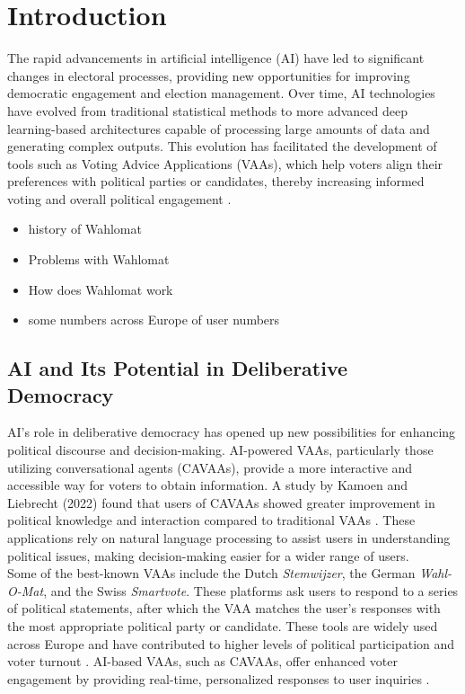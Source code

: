 \documentclass{article}
\begin{document}
\newpage
\tableofcontents
\newpage  


\section{Introduction}


The rapid advancements in artificial intelligence (AI) have led to significant changes in electoral processes, providing new opportunities for improving democratic engagement and election management. Over time, AI technologies have evolved from traditional statistical methods to more advanced deep learning-based architectures capable of processing large amounts of data and generating complex outputs. This evolution has facilitated the development of tools such as Voting Advice Applications (VAAs), which help voters align their preferences with political parties or candidates, thereby increasing informed voting and overall political engagement \cite{gemenis2024}.



\begin{itemize}
    \item history of Wahlomat
    \item Problems with Wahlomat
    \item How does Wahlomat work
    \item some numbers across Europe of user numbers
\end{itemize}


\subsection{AI and Its Potential in Deliberative Democracy}

AI's role in deliberative democracy has opened up new possibilities for enhancing political discourse and decision-making. AI-powered VAAs, particularly those utilizing conversational agents (CAVAAs), provide a more interactive and accessible way for voters to obtain information. A study by Kamoen and Liebrecht (2022) found that users of CAVAAs showed greater improvement in political knowledge and interaction compared to traditional VAAs \cite{kamoen2022}. These applications rely on natural language processing to assist users in understanding political issues, making decision-making easier for a wider range of users.
\\
Some of the best-known VAAs include the Dutch \textit{Stemwijzer}, the German \textit{Wahl-O-Mat}, and the Swiss \textit{Smartvote}. These platforms ask users to respond to a series of political statements, after which the VAA matches the user's responses with the most appropriate political party or candidate. These tools are widely used across Europe and have contributed to higher levels of political participation and voter turnout \cite{gemenis2024}. AI-based VAAs, such as CAVAAs, offer enhanced voter engagement by providing real-time, personalized responses to user inquiries \cite{kamoen2022}.
\end{document}
